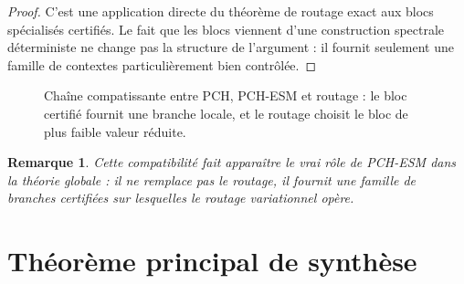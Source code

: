\documentclass[11pt,a4paper]{article}
\newtheorem{remark}{Remarque}[section]
\DeclareMathOperator{\argmin}{argmin}
\begin{document}
\begin{proof}
C'est une application directe du théorème de routage exact aux blocs spécialisés certifiés. Le fait que les blocs viennent d'une construction spectrale déterministe ne change pas la structure de l'argument : il fournit seulement une famille de contextes particulièrement bien contrôlée.
\end{proof}

\begin{figure}[ht]
\centering
{}
\caption{Chaîne compatissante entre PCH, PCH-ESM et routage : le bloc certifié fournit une branche locale, et le routage choisit le bloc de plus faible valeur réduite.}
\end{figure}

\begin{remark}
Cette compatibilité fait apparaître le vrai rôle de PCH-ESM dans la théorie globale : il ne remplace pas le routage, il fournit une famille de branches certifiées sur lesquelles le routage variationnel opère.
\end{remark}

\section{Théorème principal de synthèse}
\end{document}
